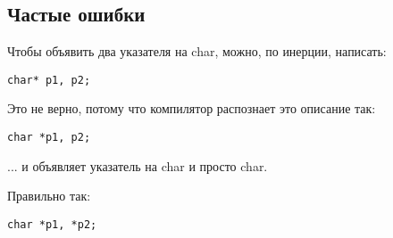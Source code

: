 ﻿\subsection{Частые ошибки}

Чтобы объявить два указателя на char, можно, по инерции, написать:

\begin{lstlisting}
char* p1, p2;
\end{lstlisting}

Это не верно, потому что компилятор распознает это описание так:

\begin{lstlisting}
char *p1, p2;
\end{lstlisting}

... и объявляет указатель на char и просто char.

Правильно так:

\begin{lstlisting}
char *p1, *p2;
\end{lstlisting}
